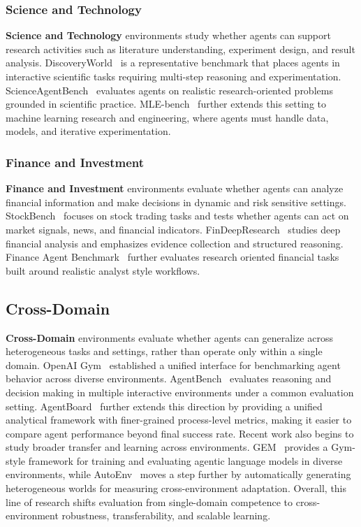 \documentclass{llmxive}
\begin{document}
\subsubsection{Science and Technology}
\label{Science and Technology}
\textbf{Science and Technology} environments study whether agents can support research activities such as literature understanding, experiment design, and result analysis. DiscoveryWorld~\cite{DiscoveryWorld} is a representative benchmark that places agents in interactive scientific tasks requiring multi-step reasoning and experimentation. ScienceAgentBench~\cite{ScienceAgentBench} evaluates agents on realistic research-oriented problems grounded in scientific practice. MLE-bench~\cite{MLE-bench} further extends this setting to machine learning research and engineering, where agents must handle data, models, and iterative experimentation.

\subsubsection{Finance and Investment}
\label{Finance}
\textbf{Finance and Investment} environments evaluate whether agents can analyze financial information and make decisions in dynamic and risk sensitive settings. StockBench~\cite{StockBench} focuses on stock trading tasks and tests whether agents can act on market signals, news, and financial indicators. FinDeepResearch~\cite{FinDeepResearch} studies deep financial analysis and emphasizes evidence collection and structured reasoning. Finance Agent Benchmark~\cite{Finance_Agent_Benchmark} further evaluates research oriented financial tasks built around realistic analyst style workflows.



\subsection{Cross-Domain}
\label{Cross-Domain}
\textbf{Cross-Domain} environments evaluate whether agents can generalize across heterogeneous tasks and settings, rather than operate only within a single domain. OpenAI Gym~\cite{Openai_gym} established a unified interface for benchmarking agent behavior across diverse environments. AgentBench~\cite{AgentBench} evaluates reasoning and decision making in multiple interactive environments under a common evaluation setting. AgentBoard~\cite{AgentBoard} further extends this direction by providing a unified analytical framework with finer-grained process-level metrics, making it easier to compare agent performance beyond final success rate. Recent work also begins to study broader transfer and learning across environments. GEM~\cite{GEM} provides a Gym-style framework for training and evaluating agentic language models in diverse environments, while AutoEnv~\cite{AutoEnv} moves a step further by automatically generating heterogeneous worlds for measuring cross-environment adaptation. Overall, this line of research shifts evaluation from single-domain competence to cross-environment robustness, transferability, and scalable learning.
\end{document}
